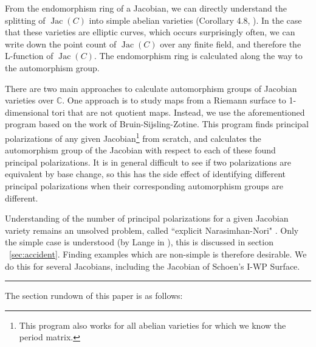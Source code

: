 \documentclass[12pt,reqno]{amsart}
\DeclareMathOperator{\Jac}{Jac}
\newcommand{\C}{\mathbb{C}}
\newcommand{\n}{\newline}
\theoremstyle{definition}
\theoremstyle{remark}
\newcommand{\ti}{\todo[inline]}
\begin{document}
From the endomorphism ring of a Jacobian, we can directly understand the splitting of $\Jac(C)$ into simple abelian varieties (Corollary 4.8, \cite{jeroen}). In the case that these varieties are elliptic curves, which occurs surprisingly often, we can write down the point count of $\Jac(C)$ over any finite field, and therefore the L-function of $\Jac(C)$. The endomorphism ring is calculated along the way to the automorphism group.


There are two main approaches to calculate automorphism groups of Jacobian varieties over $\C$. One approach is to study maps from a Riemann surface to 1-dimensional tori that are not quotient maps. Instead, we use the aforementioned program based on the work of Bruin-Sijsling-Zotine. This program finds principal polarizations of any given Jacobian\footnote{This program also works for all abelian varieties for which we know the period matrix.} from scratch, and calculates the automorphism group of the Jacobian with respect to each of these found principal polarizations. It is in general difficult to see if two polarizations are equivalent by base change, so this has the side effect of identifying different principal polarizations when their corresponding automorphism groups are different. 
    
Understanding of the number of principal polarizations for a given Jacobian variety remains an unsolved problem, called ``explicit Narasimhan-Nori" \cite{nn}. Only the simple case is understood (by Lange in \cite{several}), this is discussed in section ~\ref{sec:accident}. Finding examples which are non-simple is therefore desirable. We do this for several Jacobians, including the Jacobian of Schoen's I-WP Surface.  



\vspace{+10pt}
\hrule 

$\text{}$\n The section rundown of this paper is as follows:
\vspace{+5pt}
\end{document}
